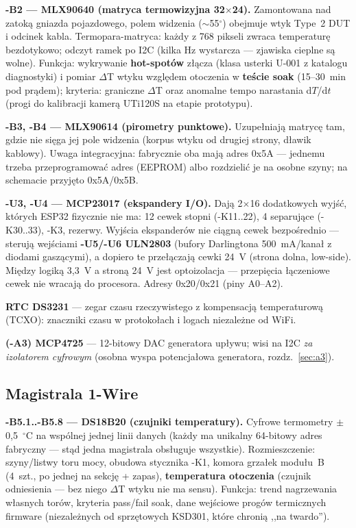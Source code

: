 \documentclass[11pt,a4paper]{article}
\begin{document}
\textbf{-B2 --- MLX90640 (matryca termowizyjna 32$\times$24).} Zamontowana nad zatoką gniazda
pojazdowego, polem widzenia ($\sim$55$^\circ$) obejmuje wtyk Type~2 DUT i odcinek kabla.
Termopara-matryca: każdy z 768 pikseli zwraca temperaturę bezdotykowo; odczyt ramek po I2C
(kilka Hz wystarcza --- zjawiska cieplne są wolne). Funkcja: wykrywanie \textbf{hot-spotów}
złącza (klasa usterki U-001 z katalogu diagnostyki) i pomiar $\Delta$T wtyku względem otoczenia
w \textbf{teście soak} (15--30~min pod prądem); kryteria: graniczne $\Delta$T oraz anomalne
tempo narastania d$T$/d$t$ (progi do kalibracji kamerą UTi120S na etapie prototypu).

\textbf{-B3, -B4 --- MLX90614 (pirometry punktowe).} Uzupełniają matrycę tam, gdzie nie sięga jej
pole widzenia (korpus wtyku od drugiej strony, dławik kablowy). Uwaga integracyjna: fabrycznie
oba mają adres 0x5A --- jednemu trzeba przeprogramować adres (EEPROM) albo rozdzielić je na
osobne szyny; na schemacie przyjęto 0x5A/0x5B.

\textbf{-U3, -U4 --- MCP23017 (ekspandery I/O).} Dają 2$\times$16 dodatkowych wyjść, których
ESP32 fizycznie nie ma: 12 cewek stopni (-K11..22), 4 separujące (-K30..33), -K3, rezerwy.
Wyjścia ekspanderów nie ciągną cewek bezpośrednio --- sterują wejściami \textbf{-U5/-U6 ULN2803}
(bufory Darlingtona 500~mA/kanał z diodami gaszącymi), a dopiero te przełączają cewki 24~V
(strona dolna, low-side). Między logiką 3,3~V a stroną 24~V jest optoizolacja --- przepięcia
łączeniowe cewek nie wracają do procesora. Adresy 0x20/0x21 (piny A0--A2).

\textbf{RTC DS3231} --- zegar czasu rzeczywistego z kompensacją temperaturową (TCXO): znaczniki
czasu w protokołach i logach niezależne od WiFi.

\textbf{(-A3) MCP4725} --- 12-bitowy DAC generatora upływu; wisi na I2C \emph{za izolatorem
cyfrowym} (osobna wyspa potencjałowa generatora, rozdz.~\ref{sec:a3}).

\subsection{Magistrala 1-Wire}
\textbf{-B5.1..-B5.8 --- DS18B20 (czujniki temperatury).} Cyfrowe termometry $\pm$0,5~$^\circ$C
na wspólnej jednej linii danych (każdy ma unikalny 64-bitowy adres fabryczny --- stąd jedna
magistrala obsługuje wszystkie). Rozmieszczenie: szyny/listwy toru mocy, obudowa stycznika -K1,
komora grzałek modułu~B (4~szt., po jednej na sekcję + zapas), \textbf{temperatura otoczenia}
(czujnik odniesienia --- bez niego $\Delta$T wtyku nie ma sensu). Funkcja: trend nagrzewania
własnych torów, kryteria pass/fail soak, dane wejściowe progów termicznych firmware (niezależnych
od sprzętowych KSD301, które chronią ,,na twardo'').
\end{document}
